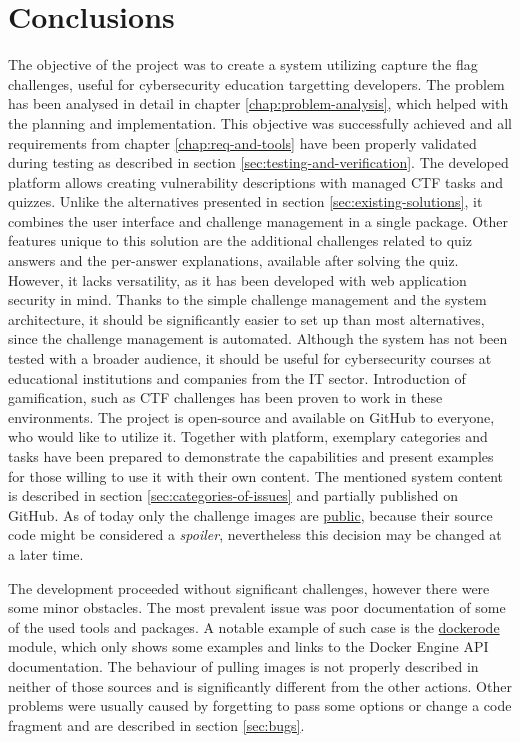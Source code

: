 \chapter{Conclusions}
\label{chap:conclusions}

The objective of the project was to create a system utilizing capture the flag challenges, useful for cybersecurity education targetting developers. The problem has been analysed in detail in chapter \ref{chap:problem-analysis}, which helped with the planning and implementation. This objective was successfully achieved and all requirements from chapter \ref{chap:req-and-tools} have been properly validated during testing as described in section \ref{sec:testing-and-verification}. The developed platform allows creating vulnerability descriptions with managed CTF tasks and quizzes. Unlike the alternatives presented in section \ref{sec:existing-solutions}, it combines the user interface and challenge management in a single package. Other features unique to this solution are the additional challenges related to quiz answers and the per-answer explanations, available after solving the quiz. However, it lacks versatility, as it has been developed with web application security in mind. Thanks to the simple challenge management and the system architecture, it should be significantly easier to set up than most alternatives, since the challenge management is automated.
Although the system has not been tested with a broader audience, it should be useful for cybersecurity courses at educational institutions and companies from the IT sector. Introduction of gamification, such as CTF challenges has been proven to work in these environments. The project is open-source and available on GitHub to everyone, who would like to utilize it. Together with platform, exemplary categories and tasks have been prepared to demonstrate the capabilities and present examples for those willing to use it with their own content. The mentioned system content is described in section \ref{sec:categories-of-issues} and partially published on GitHub. As of today only the challenge images are \href{https://github.com/krzysdz?ecosystem=container&tab=packages}{public}, because their source code might be considered a \textit{spoiler}, nevertheless this decision may be changed at a later time.

The development proceeded without significant challenges, however there were some minor obstacles. The most prevalent issue was poor documentation of some of the used tools and packages. A notable example of such case is the \href{https://github.com/apocas/dockerode}{dockerode} module, which only shows some examples and links to the Docker Engine API documentation. The behaviour of pulling images is not properly described in neither of those sources and is significantly different from the other actions. Other problems were usually caused by forgetting to pass some options or change a code fragment and are described in section \ref{sec:bugs}.

